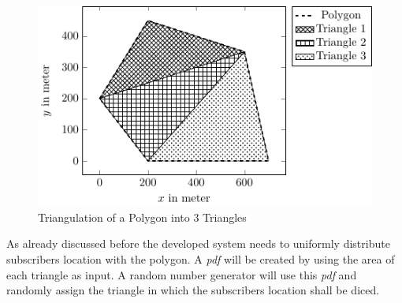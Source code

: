 \documentclass[master,english]{hgbthesis}
\begin{document}
\begin{figure}
	\centering
	\includegraphics[width=\columnwidth]{./images/population_poly}
%
%
%
%
%
%
%
	\caption{Triangulation of a Polygon into 3 Triangles}
	\label{fig:triangulation}
\end{figure}
As already discussed before the developed system needs to uniformly distribute subscribers location with the polygon. A \emph{pdf} will be created by using the area of each triangle as input. A random number generator will use this \emph{pdf} and randomly assign the triangle in which the subscribers location shall be diced.
\end{document}
